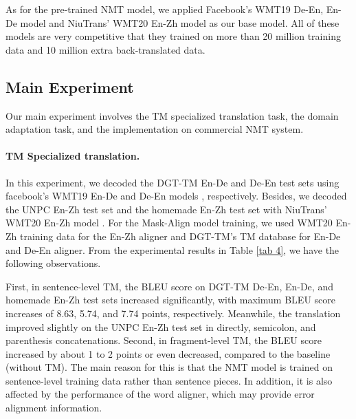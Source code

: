 \documentclass[letterpaper]{article} %
\begin{document}
As for the pre-trained NMT model, we applied Facebook's WMT19 De-En, En-De model \cite{Nathan2019Facebook} and NiuTrans' WMT20 En-Zh model \cite{Yuhao2020TheNiuTrans} as our base model. All of these models are very competitive that they trained on more than 20 million training data and 10 million extra back-translated data.

\subsection{Main Experiment}
Our main experiment involves the TM specialized translation task, the domain adaptation task, and the implementation on commercial NMT system.

\paragraph{TM Specialized translation.}

In this experiment, we decoded the DGT-TM En-De and De-En test sets using facebook's WMT19 En-De and De-En models \cite{Nathan2019Facebook}, respectively. Besides, we decoded the UNPC En-Zh test set and the homemade En-Zh test set with NiuTrans' WMT20 En-Zh model \cite{Yuhao2020TheNiuTrans}. For the Mask-Align model training, we used WMT20 En-Zh training data for the En-Zh aligner and DGT-TM's TM database for En-De and De-En aligner.
From the experimental results in Table \ref{tab 4}, we have the following observations.

First, in sentence-level TM, the BLEU score on DGT-TM De-En, En-De, and homemade En-Zh test sets increased significantly, with maximum BLEU score increases of 8.63, 5.74, and 7.74 points, respectively. Meanwhile, the translation improved slightly on the UNPC En-Zh test set in directly, semicolon, and parenthesis concatenations. Second, in fragment-level TM, the BLEU score increased by about 1 to 2 points or even decreased, compared to the baseline (without TM). The main reason for this is that the NMT model is trained on sentence-level training data rather than sentence pieces. In addition, it is also affected by the performance of the word aligner, which may provide error alignment information.
\end{document}
